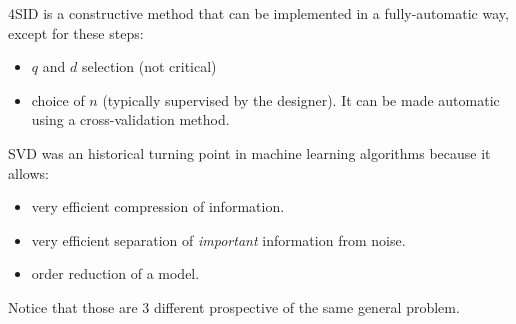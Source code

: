\begin{remark}
    4SID is a constructive method that can be implemented in a fully-automatic way, except for these steps:
    \begin{itemize}
        \item $q$ and $d$ selection (not critical)
        \item choice of $n$ (typically supervised by the designer). It can be made automatic using a cross-validation method.
    \end{itemize}
\end{remark}

\begin{remark}
    SVD was an historical turning point in machine learning algorithms because it allows:
    \begin{itemize}
        \item very efficient compression of information.
        \item very efficient separation of \emph{important} information from noise.
        \item order reduction of a model.
    \end{itemize}
    Notice that those are 3 different prospective of the same general problem.
\end{remark}
